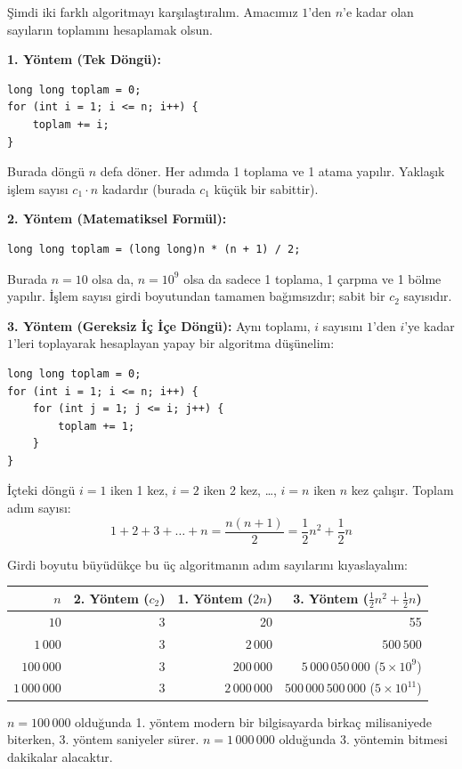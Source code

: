 Şimdi iki farklı algoritmayı karşılaştıralım. Amacımız $1$'den $n$'e kadar olan sayıların toplamını hesaplamak olsun.

\textbf{1. Yöntem (Tek Döngü):}
\begin{lstlisting}[language=CTemel]
long long toplam = 0;
for (int i = 1; i <= n; i++) {
    toplam += i;
}
\end{lstlisting}
Burada döngü $n$ defa döner. Her adımda 1 toplama ve 1 atama yapılır. Yaklaşık işlem sayısı $c_1 \cdot n$ kadardır (burada $c_1$ küçük bir sabittir).

\textbf{2. Yöntem (Matematiksel Formül):}
\begin{lstlisting}[language=CTemel]
long long toplam = (long long)n * (n + 1) / 2;
\end{lstlisting}
Burada $n = 10$ olsa da, $n = 10^9$ olsa da sadece 1 toplama, 1 çarpma ve 1 bölme yapılır. İşlem sayısı girdi boyutundan tamamen bağımsızdır; sabit bir $c_2$ sayısıdır.

\textbf{3. Yöntem (Gereksiz İç İçe Döngü):}
Aynı toplamı, $i$ sayısını $1$'den $i$'ye kadar $1$'leri toplayarak hesaplayan yapay bir algoritma düşünelim:
\begin{lstlisting}[language=CTemel]
long long toplam = 0;
for (int i = 1; i <= n; i++) {
    for (int j = 1; j <= i; j++) {
        toplam += 1;
    }
}
\end{lstlisting}
İçteki döngü $i = 1$ iken 1 kez, $i = 2$ iken 2 kez, \dots, $i = n$ iken $n$ kez çalışır. Toplam adım sayısı:
\[ 1 + 2 + 3 + \dots + n = \frac{n(n+1)}{2} = \frac{1}{2}n^2 + \frac{1}{2}n \]

Girdi boyutu büyüdükçe bu üç algoritmanın adım sayılarını kıyaslayalım:

\begin{center}
\begin{tabular}{|r|r|r|r|}
\hline
$n$ & 2. Yöntem ($c_2$) & 1. Yöntem ($2n$) & 3. Yöntem ($\frac{1}{2}n^2 + \frac{1}{2}n$) \\
\hline
$10$ & 3 & 20 & 55 \\
$1\,000$ & 3 & $2\,000$ & $500\,500$ \\
$100\,000$ & 3 & $200\,000$ & $5\,000\,050\,000$ ($5 \times 10^9$) \\
$1\,000\,000$ & 3 & $2\,000\,000$ & $500\,000\,500\,000$ ($5 \times 10^{11}$) \\
\hline
\end{tabular}
\end{center}

$n = 100\,000$ olduğunda 1. yöntem modern bir bilgisayarda birkaç milisaniyede biterken, 3. yöntem saniyeler sürer. $n = 1\,000\,000$ olduğunda 3. yöntemin bitmesi dakikalar alacaktır.

